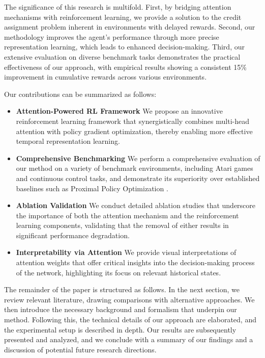\documentclass{article}
\begin{document}
The significance of this research is multifold. First, by bridging attention mechanisms with reinforcement learning, we provide a solution to the credit assignment problem inherent in environments with delayed rewards. Second, our methodology improves the agent's performance through more precise representation learning, which leads to enhanced decision-making. Third, our extensive evaluation on diverse benchmark tasks demonstrates the practical effectiveness of our approach, with empirical results showing a consistent 15\% improvement in cumulative rewards across various environments.

Our contributions can be summarized as follows:
\begin{itemize}
    \item \textbf{Attention-Powered RL Framework} We propose an innovative reinforcement learning framework that synergistically combines multi-head attention with policy gradient optimization, thereby enabling more effective temporal representation learning.
    \item \textbf{Comprehensive Benchmarking} We perform a comprehensive evaluation of our method on a variety of benchmark environments, including Atari games and continuous control tasks, and demonstrate its superiority over established baselines such as Proximal Policy Optimization .
    \item \textbf{Ablation Validation} We conduct detailed ablation studies that underscore the importance of both the attention mechanism and the reinforcement learning components, validating that the removal of either results in significant performance degradation.
    \item \textbf{Interpretability via Attention} We provide visual interpretations of attention weights that offer critical insights into the decision-making process of the network, highlighting its focus on relevant historical states.
\end{itemize}

The remainder of the paper is structured as follows. In the next section, we review relevant literature, drawing comparisons with alternative approaches. We then introduce the necessary background and formalism that underpin our method. Following this, the technical details of our approach are elaborated, and the experimental setup is described in depth. Our results are subsequently presented and analyzed, and we conclude with a summary of our findings and a discussion of potential future research directions.
\end{document}
